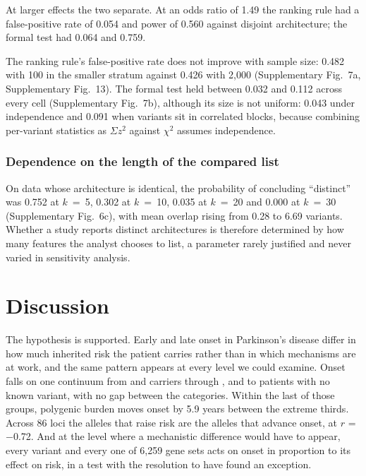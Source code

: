 \documentclass[10pt]{article}
\begin{document}
At larger effects the two separate. At an odds ratio of 1.49 the ranking rule had a false-positive
rate of 0.054 and power of 0.560 against disjoint architecture; the formal test had 0.064 and
0.759.

The ranking rule's false-positive rate does not improve with sample size: 0.482 with 100 in the
smaller stratum against 0.426 with 2,000 (Supplementary Fig.~7a, Supplementary Fig.~13). The formal test held between 0.032 and 0.112
across every cell (Supplementary Fig.~7b), although its size is not uniform: 0.043 under independence and 0.091
when variants sit in correlated blocks, because combining per-variant statistics as $\Sigma z^2$
against $\chi^2$ assumes independence.

\subsubsection*{Dependence on the length of the compared list}

On data whose architecture is identical, the probability of concluding ``distinct'' was 0.752 at
$k$~=~5, 0.302 at $k$~=~10, 0.035 at $k$~=~20 and 0.000 at $k$~=~30 (Supplementary Fig.~6c), with mean overlap
rising from 0.28 to 6.69 variants. Whether a study reports distinct architectures is therefore
determined by how many features the analyst chooses to list, a parameter rarely justified and
never varied in sensitivity analysis.

\section*{Discussion}

The hypothesis is supported. Early and late onset in Parkinson's disease differ in how much inherited risk the patient carries rather than in which mechanisms are at work, and the same pattern appears at every level we could examine. Onset falls on one continuum from  and  carriers
through ,  and  to patients with no known variant, with no gap
between the categories. Within the last of those groups, polygenic burden moves onset by 5.9 years
between the extreme thirds. Across 86 loci the alleles that raise risk are the alleles that advance
onset, at $r$ = $-$0.72. And at the level where a mechanistic difference would have to appear, every variant and every one of 6,259 gene sets acts on onset in proportion to its effect on risk, in a test with the resolution to have found an exception.
\end{document}
